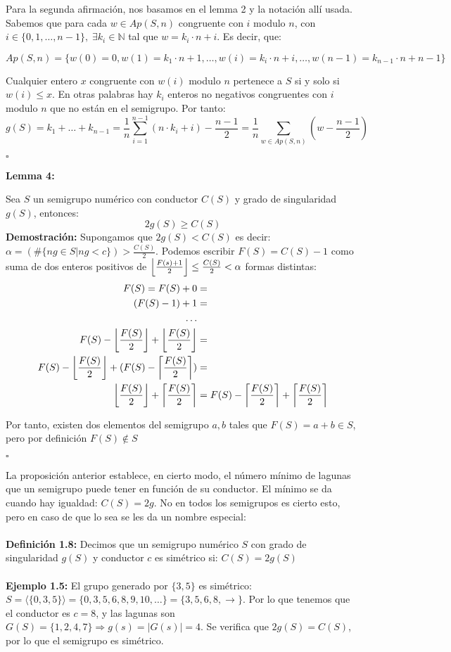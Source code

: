 \documentclass[11pt,spanish]{book}
\newcommand{\qed}{\begin{flushright} $\square$ \end{flushright}}
\DeclarePairedDelimiter\ceil{\lceil}{\rceil}
\DeclarePairedDelimiter\floor{\lfloor}{\rfloor}
\begin{document}
Para la segunda afirmación, nos basamos en el lemma 2 y la notación allí usada. Sabemos que para cada $w\in Ap(S,n)$ congruente con $i$ modulo $n$, con $i\in\{0,1,\ldots,n-1\},\;\exists k_{i}\in\mathbb{N}$ tal que $w=k_{i}\cdot n + i$. Es decir, que: 

$$Ap(S,n)=\{w(0)=0, w(1)=k_{1}\cdot n + 1,\ldots,w(i)=k_{i}\cdot n +i,\ldots,w(n-1)=k_{n-1}\cdot n+n-1\}$$

Cualquier entero $x$ congruente con $w(i)$ modulo $n$ pertenece a $S$ si y solo si $w(i)\leq x$. En otras palabras hay $k_{i}$ enteros no negativos congruentes con $i$ modulo $n$ que no están en el semigrupo. Por tanto:
$$ g(S) = k_{1}+\ldots+k_{n-1} = \frac{1}{n}\sum_{i=1}^{n-1}(n\cdot k_{i}+i) -\frac{n-1}{2} = \frac{1}{n}\sum_{w\in Ap(S,n)}(w -\frac{n-1}{2})$$
\qed
\hypertarget{lema1.4}{\textbf{Lemma 4:} } Sea $S$ un semigrupo numérico con conductor $C(S)$ y grado de singularidad $g(S)$, entonces:
$$ 2g(S)\geq C(S)$$
\textbf{Demostración:} Supongamos que $ 2g(S)<C(S)$ es decir: $\alpha = (\#\{ ng\in S | ng<c \})> \frac{C(S)}{2}$. Podemos escribir $F(S) = C(S)-1$ como suma de dos enteros positivos de $\floor*{\frac{F(s)+1}{2}}\leq\frac{C(S)}{2} < \alpha$ formas distintas:
\begin{align*}
F(S) = F(S) + 0 &=\\
(F(S)-1) + 1 &= \\
\ldots \\
F(S) - \floor*{\frac{F(S)}{2}} + \floor*{\frac{F(S)}{2}} &=\\
F(S) - \floor*{\frac{F(S)}{2}} + (F(S)-\ceil*{\frac{F(S)}{2}}) &=\\
\floor*{\frac{F(S)}{2}} + \ceil*{\frac{F(S)}{2}} &=F(S)-\ceil*{\frac{F(S)}{2}}+\ceil*{\frac{F(S)}{2}}
\end{align*}

Por tanto, existen dos elementos del semigrupo $a,b$ tales que $F(S) = a+b\in S$, pero por definición $F(S)\notin S$
\qed

La proposición anterior establece, en cierto modo, el número mínimo de lagunas que un semigrupo puede tener en función de su conductor. El mínimo se da cuando hay igualdad: $C(S)=2g$. No en todos los semigrupos es cierto esto, pero en caso de que lo sea se les da un nombre especial:\\ \\
\textbf{Definición 1.8:} Decimos que un semigrupo numérico $S$ con grado de singularidad $g(S)$ y conductor $c$ es simétrico si: $C(S) = 2g(S)$\\
\\ \textbf{Ejemplo 1.5:} El grupo generado por $\{3,5\}$ es simétrico: $S=\langle\{0,3,5\}\rangle = \{0,3,5,6,8,9,10,\ldots\} = \{3,5,6,8,\rightarrow\}$. Por lo que tenemos que el conductor es $c=8$, y las lagunas son $G(S)=\{1,2,4,7\}\Rightarrow g(s)=|G(s)|=4$. Se verifica que $2g(S) = C(S)$, por lo que el semigrupo es simétrico.\\
\end{document}

